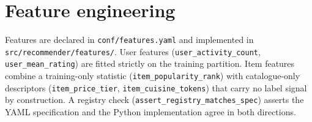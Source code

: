\section{Feature engineering}
Features are declared in \texttt{conf/features.yaml} and implemented in
\texttt{src/recommender/features/}. User features (\texttt{user\_activity\_count},
\texttt{user\_mean\_rating}) are fitted strictly on the training partition.
Item features combine a training-only statistic (\texttt{item\_popularity\_rank})
with catalogue-only descriptors (\texttt{item\_price\_tier},
\texttt{item\_cuisine\_tokens}) that carry no label signal by construction.
A registry check (\texttt{assert\_registry\_matches\_spec}) asserts the YAML
specification and the Python implementation agree in both directions.
